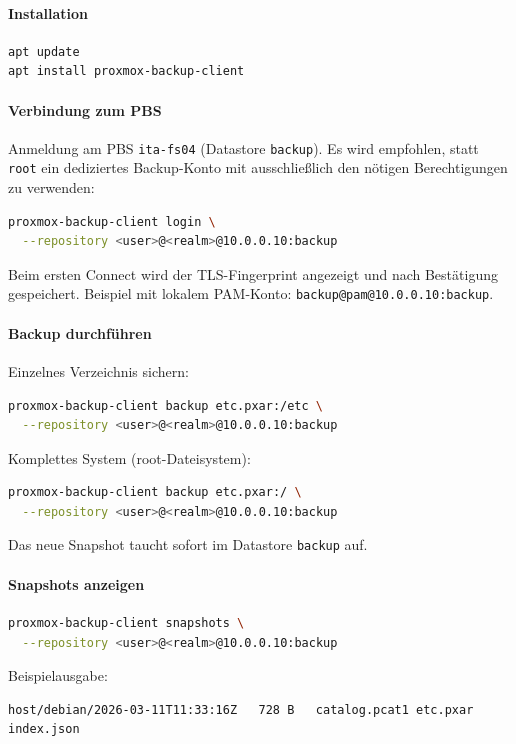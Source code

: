 \paragraph*{Installation}
\begin{lstlisting}[language=bash]
apt update
apt install proxmox-backup-client
\end{lstlisting}

\paragraph*{Verbindung zum \ac{PBS}}
Anmeldung am \ac{PBS} \texttt{ita-fs04} (Datastore \texttt{backup}).
Es wird empfohlen, statt \texttt{root} ein dediziertes Backup-Konto
mit ausschließlich den nötigen Berechtigungen zu verwenden:
\begin{lstlisting}[language=bash]
proxmox-backup-client login \
  --repository <user>@<realm>@10.0.0.10:backup
\end{lstlisting}
Beim ersten Connect wird der TLS-Fingerprint angezeigt und nach
Bestätigung gespeichert. Beispiel mit lokalem PAM-Konto:
\texttt{backup@pam@10.0.0.10:backup}.

\paragraph*{Backup durchführen}
Einzelnes Verzeichnis sichern:
\begin{lstlisting}[language=bash]
proxmox-backup-client backup etc.pxar:/etc \
  --repository <user>@<realm>@10.0.0.10:backup
\end{lstlisting}
Komplettes System (root-Dateisystem):
\begin{lstlisting}[language=bash]
proxmox-backup-client backup etc.pxar:/ \
  --repository <user>@<realm>@10.0.0.10:backup
\end{lstlisting}
Das neue Snapshot taucht sofort im Datastore \texttt{backup} auf.

\paragraph*{Snapshots anzeigen}
\begin{lstlisting}[language=bash]
proxmox-backup-client snapshots \
  --repository <user>@<realm>@10.0.0.10:backup
\end{lstlisting}
Beispielausgabe:
\begin{lstlisting}
host/debian/2026-03-11T11:33:16Z   728 B   catalog.pcat1 etc.pxar index.json
\end{lstlisting}

